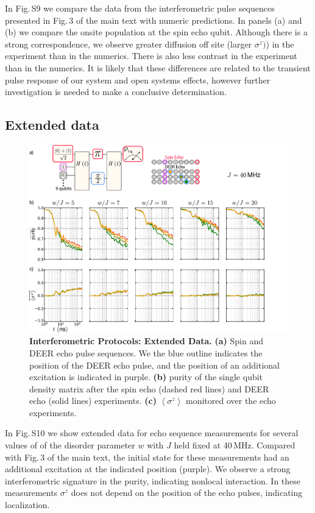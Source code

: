 In Fig.\,S9 we compare the data from the interferometric pulse sequences presented in Fig.\,3 of the main text with numeric predictions.  In panels (a) and (b) we compare the onsite population at the spin echo qubit.  Although there is a strong correspondence, we observe greater diffusion off site (larger $\sigma^z)$)  in the experiment than in the numerics.  There is also less contrast in the experiment than in the numerics.  It is likely that these differences are related to the transient pulse response of our system and open systems effects, however further investigation is needed to make a conclusive determination.

\subsection{Extended data}
\begin{figure}
\centering
\includegraphics[width=140mm, keepaspectratio]{./PDF/fs9_190919_513p.pdf}%
\caption{\textbf{Interferometric Protocols:  Extended Data.}
\textbf{(a)} Spin and DEER echo pulse sequences.  We the blue outline indicates the position of the DEER echo pulse, and the position of an additional excitation is indicated in purple.
\textbf{(b)} purity of the single qubit density matrix after the spin echo (dashed red lines) and DEER echo (solid lines) experiments.
\textbf{(c)} $\left< \sigma^z \right>$ monitored over the echo experiments.
}
\label{fig_3}
\end{figure}

In Fig.\,S10 we show extended data for echo sequence measurements for several values of of the disorder parameter $w$ with $J$ held fixed at 40\,MHz.  Compared with Fig.\,3 of the main text, the initial state for these measurements had an additional excitation at the indicated position (purple).  We observe a strong interferometric signature in the purity, indicating nonlocal interaction.  In these measurements $\sigma^z$ does not depend on the position of the echo pulses, indicating localization.


